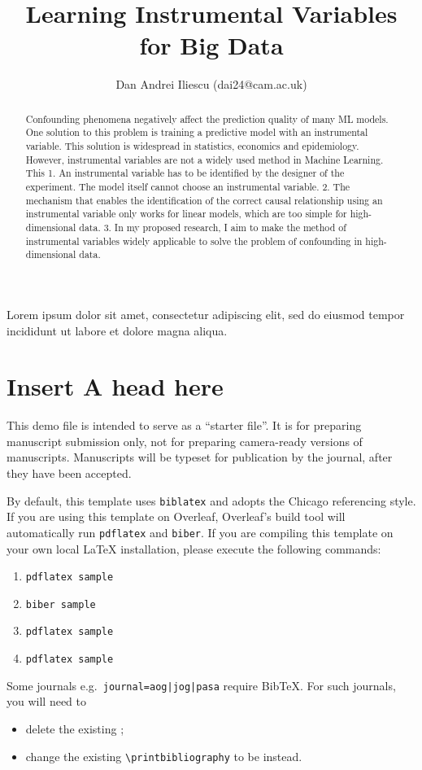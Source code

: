 \documentclass[
  journal=medium,
  manuscript=Qualcomm-Innovation-Fellowship-Proposal,
  year=22-February-2023,
]{cup-journal}
\title{Learning Instrumental Variables for Big Data}
\author{Dan Andrei Iliescu (dai24@cam.ac.uk)}
\affiliation{Department of Computer Science and Technology, University of Cambridge, UK}
\begin{document}
\begin{abstract}
Confounding phenomena negatively affect the prediction quality of many ML models.
One solution to this problem is training a predictive model with an instrumental variable.
This solution is widespread in statistics, economics and epidemiology.
However, instrumental variables are not a widely used method in Machine Learning.
This  
1. An instrumental variable has to be identified by the designer of the experiment. The model itself cannot choose an instrumental variable.
2. The mechanism that enables the identification of the correct causal relationship using an instrumental variable only works for linear models, which are too simple for high-dimensional data.
3. 
In my proposed research, I aim to make the method of instrumental variables widely applicable to solve the problem of confounding in high-dimensional data.
\end{abstract}

Lorem ipsum dolor sit amet, consectetur adipiscing elit, sed do eiusmod tempor incididunt ut labore et dolore magna aliqua. 

\section{Insert A head here}
This demo file is intended to serve as a ``starter file''. It is for preparing manuscript submission only, not for preparing camera-ready versions of manuscripts. Manuscripts will be typeset for publication by the journal, after they have been accepted.

By default, this template uses \texttt{biblatex} and adopts the Chicago referencing style. If you are using this template on Overleaf, Overleaf's build tool will automatically run \texttt{pdflatex} and \texttt{biber}. If you are compiling this template on your own local \LaTeX{} installation, please execute the following commands:
\begin{enumerate}
    \item \verb|pdflatex sample|
    \item \verb|biber sample|
    \item \verb|pdflatex sample|
    \item \verb|pdflatex sample|
\end{enumerate}

Some journals e.g.~\texttt{journal=aog|jog|pasa} require Bib\TeX{}. For such journals, you will need to
\begin{itemize}
    \item delete the existing \verb||;
    \item change the existing \verb|\printbibliography| to be \verb|| instead.
\end{itemize} 
\end{document}
